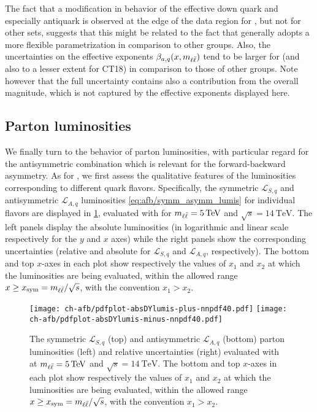 The fact that a modification in behavior of the effective down quark
and especially antiquark \pdfs is observed at the edge of the data
region for , but not for other \pdf sets, suggests that this
might be related to the fact that   generally adopts a more
flexible \pdf parametrization in comparison to other groups.
%
Also, the  uncertainties on the effective exponents
$\beta_{a,q}(x,m_{\ell\bar{\ell}})$ tend to be larger for  (and also to a
lesser extent for CT18) in comparison to those of other groups.
Note however that the full \pdf uncertainty contains also a
contribution from the overall 
magnitude, which is not captured by the effective exponents displayed here.

\subsection{Parton luminosities}
\label{sec:afb/partoniclumis}

We finally turn to the behavior of parton luminosities, with
particular regard for the antisymmetric combination which is relevant
for the forward-backward asymmetry.
As for \pdfs, we first assess the qualitative features of the
luminosities corresponding to different quark flavors.
Specifically, the symmetric $\mathcal{L}_{S,q}$ and antisymmetric
$\mathcal{L}_{A,q}$ luminosities
\cref{eq:afb/symm_asymm_lumis}  for individual flavors are
displayed in \cref{fig:afb/pdfplot-absDYlumis-plus-nnpdf40},
evaluated with  \nnlo for $\mll=\SI{5}{\tera\electronvolt}$ and $\sqrt{s}=\SI{14}{\tera\electronvolt}$.
%
The left panels display the absolute luminosities (in logarithmic and
linear scale respectively
for the $y$ and $x$ axes)
while the right panels show the corresponding \pdf uncertainties (relative and absolute for
$\mathcal{L}_{S,q}$ and $\mathcal{L}_{A,q}$, respectively).
%
The bottom  and top $x$-axes in each plot show respectively the values
of $x_1$ and $x_2$  at which the
luminosities are being evaluated, within the allowed range
$x \ge x_{\text{sym}}=m_{\ell\bar{\ell}}/\sqrt{s}$, with the convention $x_1>x_2$.

\begin{figure}[!t]
 \centering
 \texttt{[image: ch-afb/pdfplot-absDYlumis-plus-nnpdf40.pdf]}
 \texttt{[image: ch-afb/pdfplot-absDYlumis-minus-nnpdf40.pdf]}
 \caption{The symmetric $\mathcal{L}_{S,q}$ (top)
   and antisymmetric $\mathcal{L}_{A,q}$ (bottom)
   parton
   luminosities (left) and relative uncertainties (right) evaluated with
    \nnlo at $\mll=\SI{5}{\tera\electronvolt}$ and $\sqrt{s}=\SI{14}{\tera\electronvolt}$.
The bottom  and top $x$-axes in each plot show respectively the values
of $x_1$ and $x_2$  at which the
luminosities are being evaluated, within the allowed range
$x \ge x_{\text{sym}}=m_{\ell\bar{\ell}}/\sqrt{s}$, with the convention $x_1>x_2$.}    
 \label{fig:afb/pdfplot-absDYlumis-plus-nnpdf40}
\end{figure}

